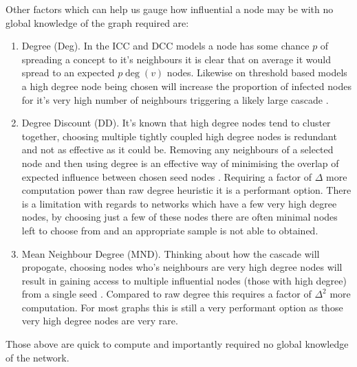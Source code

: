 \documentclass{article}
\begin{document}
Other factors which can help us gauge how influential a node may be with no global knowledge of the graph required are:
\begin{enumerate}
	\item Degree (Deg). In the ICC and DCC models a node has some chance $p$ of spreading a concept to it's neighbours it is clear that on average it would spread to an expected $p \deg(v)$ nodes.
	      Likewise on threshold based models a high degree node being chosen will increase the proportion of infected nodes for it's very high number of neighbours triggering a likely large cascade \cite{tardoskempe2003}.
	\item Degree Discount (DD). It's known that high degree nodes tend to cluster together, choosing multiple tightly coupled high degree nodes is redundant and not as effective as it could be. Removing any neighbours of a selected node and then using degree is an effective way of minimising the overlap of expected influence between chosen seed nodes \cite{franks2014learning}.
	      Requiring a factor of $\Delta$ more computation power than raw degree heuristic it is a performant option.
	      There is a limitation with regards to networks which have a few very high degree nodes, by choosing just a few of these nodes there are often minimal nodes left to choose from and an appropriate sample is not able to obtained.
	\item Mean Neighbour Degree (MND). Thinking about how the cascade will propogate, choosing nodes who's neighbours are very high degree nodes will result in gaining access to multiple influential nodes (those with high degree) from a single seed \cite{franks2014learning}.
	      Compared to raw degree this requires a factor of $\Delta^2$ more computation. For most graphs this is still a very performant option as those very high degree nodes are very rare.
\end{enumerate}
Those above are quick to compute and importantly required no global knowledge of the network.
\end{document}
